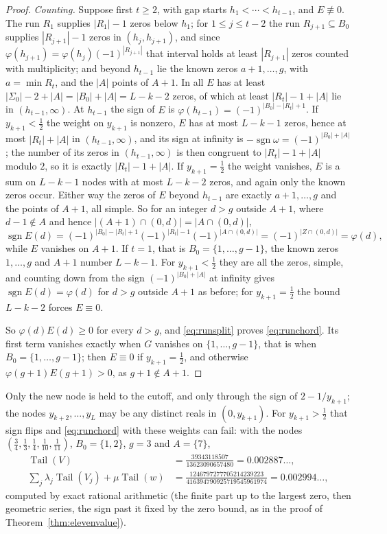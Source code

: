 \documentclass[11pt]{article}
\theoremstyle{definition}
\theoremstyle{plain}
\DeclareMathOperator{\Tail}{Tail}
\DeclareMathOperator{\sgn}{sgn}
\begin{document}
\begin{proof}
\emph{Counting.}  Suppose first $t\ge2$, with gap starts
$h_1<\cdots<h_{t-1}$, and $E\not\equiv0$.  The run $R_1$ supplies $|R_1|-1$
zeros below $h_1$; for $1\le j\le t-2$ the run $R_{j+1}\subseteq B_0$
supplies $|R_{j+1}|-1$ zeros in $(h_j,h_{j+1})$, and since
$\varphi(h_{j+1})=\varphi(h_j)(-1)^{|R_{j+1}|}$ that interval holds at least
$|R_{j+1}|$ zeros counted with multiplicity; and beyond $h_{t-1}$ lie the
known zeros $a+1,\ldots,g$, with $a=\min R_t$, and the $|A|$ points of $A+1$.
In all $E$ has at least $|\Sigma_0|-2+|A|=|B_0|+|A|=L-k-2$ zeros, of which at least
$|R_t|-1+|A|$ lie in $(h_{t-1},\infty)$.  At $h_{t-1}$ the sign of $E$ is
$\varphi(h_{t-1})=(-1)^{|B_0|-|R_t|+1}$.  If $y_{k+1}<\tfrac12$ the weight on
$y_{k+1}$ is nonzero, $E$ has at most $L-k-1$ zeros, hence at most
$|R_t|+|A|$ in $(h_{t-1},\infty)$, and its sign at infinity is
$-\sgn\omega=(-1)^{|B_0|+|A|}$; the number of its zeros in
$(h_{t-1},\infty)$ is then congruent to $|R_t|-1+|A|$ modulo $2$, so it is
exactly $|R_t|-1+|A|$.  If $y_{k+1}=\tfrac12$ the weight vanishes, $E$ is a
sum on $L-k-1$ nodes with at most $L-k-2$ zeros, and again only the known
zeros occur.  Either way the zeros of $E$ beyond $h_{t-1}$ are exactly
$a+1,\ldots,g$ and the points of $A+1$, all simple.  So for an integer $d>g$
outside $A+1$, where $d-1\notin A$ and hence $|(A+1)\cap(0,d)|=|A\cap(0,d)|$,
\[
  \sgn E(d)=(-1)^{|B_0|-|R_t|+1}(-1)^{|R_t|-1}(-1)^{|A\cap(0,d)|}
  =(-1)^{|Z\cap(0,d)|}=\varphi(d),
\]
while $E$ vanishes on $A+1$.  If $t=1$, that is $B_0=\{1,\ldots,g-1\}$, the
known zeros $1,\ldots,g$ and $A+1$ number $L-k-1$.  For $y_{k+1}<\tfrac12$
they are all the zeros, simple, and counting down from the sign
$(-1)^{|B_0|+|A|}$ at infinity gives $\sgn E(d)=\varphi(d)$ for $d>g$ outside
$A+1$ as before; for $y_{k+1}=\tfrac12$ the bound $L-k-2$ forces
$E\equiv0$.

So $\varphi(d)E(d)\ge0$ for every $d>g$, and \eqref{eq:runsplit} proves
\eqref{eq:runchord}.  Its first term vanishes exactly when $G$ vanishes on
$\{1,\ldots,g-1\}$, that is when $B_0=\{1,\ldots,g-1\}$; then $E\equiv0$ if
$y_{k+1}=\tfrac12$, and otherwise $\varphi(g+1)E(g+1)>0$, as $g+1\notin A+1$.
\end{proof}

Only the new node is held to the cutoff, and only through the sign of
$2-1/y_{k+1}$; the nodes $y_{k+2},\ldots,y_L$ may be any distinct reals in
$(0,y_{k+1})$.  For $y_{k+1}>\tfrac12$ that sign flips and
\eqref{eq:runchord} with these weights can fail: with the nodes
$(\tfrac34,\tfrac13,\tfrac14,\tfrac1{10},\tfrac1{11})$, $B_0=\{1,2\}$, $g=3$
and $A=\{7\}$,
\begin{align*}
  \Tail(V)&=\tfrac{39343118507}{13623090657480}=0.002887\ldots,\\
  \sum_j\lambda_j\Tail(V_j)+\mu\Tail(w)
  &=\tfrac{1246797277705214239223}{416394790925719545961974}=0.002994\ldots,
\end{align*}
computed by exact rational arithmetic (the finite part up to the largest
zero, then geometric series, the sign past it fixed by the zero bound, as in
the proof of Theorem~\ref{thm:elevenvalue}).
\end{document}

